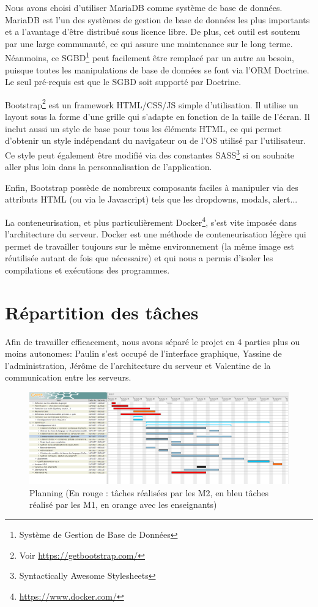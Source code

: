 \par Nous avons choisi d'utiliser MariaDB comme système de base de données. MariaDB est l'un des systèmes de gestion de base de données les plus importants et a l'avantage d'être distribué sous licence libre. De plus, cet outil est soutenu par une large communauté, ce qui assure une maintenance sur le long terme. Néanmoins, ce SGBD\footnote{Système de Gestion de Base de Données} peut facilement être remplacé par un autre au besoin, puisque toutes les manipulations de base de données se font via l'ORM Doctrine. Le seul pré-requis est que le SGBD soit supporté par Doctrine. \\

\par Bootstrap\footnote{Voir \url{https://getbootstrap.com/}} est un framework HTML/CSS/JS simple d'utilisation. Il utilise un layout sous la forme d'une grille qui s'adapte en fonction de la taille de l'écran. Il inclut aussi un style de base pour tous les éléments HTML, ce qui permet d'obtenir un style indépendant du navigateur ou de l'OS utilisé par l'utilisateur. Ce style peut également être modifié via des constantes SASS\footnote{Syntactically Awesome Stylesheets} si on souhaite aller plus loin dans la personnalisation de l'application.
\par Enfin, Bootstrap possède de nombreux composants faciles à manipuler via des attributs HTML (ou via le Javascript) tels que les dropdowns, modals, alert... \\

\par La conteneurisation, et plus particulièrement Docker\footnote{\url{https://www.docker.com/}}, s'est vite imposée dans l'architecture du serveur. Docker est une méthode de conteneurisation légère qui permet de travailler toujours sur le même environnement (la même image est réutilisée autant de fois que nécessaire) et qui nous a permis d'isoler les compilations et exécutions des programmes.

\section{Répartition des tâches}

\par Afin de travailler efficacement, nous avons séparé le projet en 4 parties plus ou moins autonomes: Paulin s'est occupé de l'interface graphique, Yassine de l'administration, Jérôme de l'architecture du serveur et Valentine de la communication entre les serveurs.

\begin{figure}[H]
\centering
\includegraphics[width=1\textwidth]{./img/gantt_LIDE.png}
\caption{Planning (En rouge : tâches réalisées par les M2, en bleu tâches réalisé par les M1, en orange avec les enseignants)}
\end{figure}
